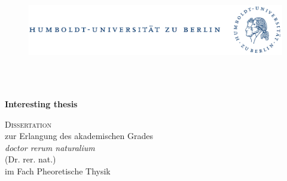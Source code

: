 \begin{titlepage}
  \begin{center}
    
    \vspace{-2cm}
    \begin{figure}[ht]
      \begin{center}
        \includegraphics[width=\textwidth]{figures/HUB-Emblem}
      \end{center}
    \end{figure}

    \begin{Large}
      \begin{center}
		\noindent\hrulefill \\
		\Large{}
		\vspace{-3mm}
		\noindent\hrulefill \\
      \end{center}
      \vspace{0.2cm}

      \begin{center}
        \Large{\textbf{
         \noindent Interesting thesis
        }}\\
      \end{center}
     \end{Large}
    
    \begin{large}
      \begin{center}
	\vspace{0.5cm} \textsc{Dissertation}\\ 
	\vspace{0.5cm} zur Erlangung des akademischen Grades \\ 
    \vspace{0.2cm}
    \textit{doctor rerum naturalium}\\
    (Dr. rer. nat.)\\
    \vspace{0.2cm}
    im Fach Pheoretische Thysik
      \end{center}
    \end{large}


\end{center}
\end{titlepage}
